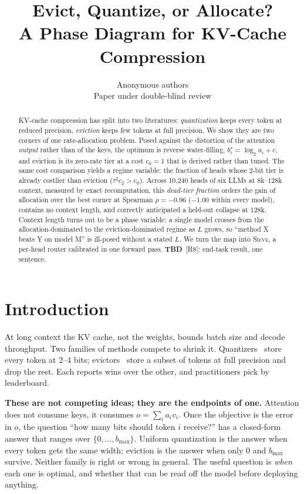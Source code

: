 \documentclass{article} %
\title{Evict, Quantize, or Allocate?\\A Phase Diagram for KV-Cache Compression}
\author{Anonymous authors \\ Paper under double-blind review}
\newcommand{\tbd}[1]{{\color{tbdcol}\textbf{TBD}~#1}}
\newcommand{\sieve}{\textsc{Sieve}}
\theoremstyle{definition}
\begin{document}
\maketitle

\begin{abstract}
KV-cache compression has split into two literatures: \emph{quantization} keeps every token at reduced precision, \emph{eviction} keeps few tokens at full precision. We show they are two corners of one rate-allocation problem. Posed against the distortion of the attention \emph{output} rather than of the keys, the optimum is reverse water-filling, $b_i^\star=\log_2 a_i+c$, and eviction is its zero-rate tier at a cost $c_0{=}1$ that is derived rather than tuned. The same cost comparison yields a regime variable: the fraction of heads whose 2-bit tier is already costlier than eviction ($\tau^2c_2>c_0$). Across 10{,}240 heads of six LLMs at 8k--128k context, measured by exact recomputation, this \emph{dead-tier fraction} orders the gain of allocation over the best corner at Spearman $\rho=-0.96$ ($-1.00$ within every model), contains no context length, and correctly anticipated a held-out collapse at 128k. Context length turns out to be a phase variable: a single model crosses from the allocation-dominated to the eviction-dominated regime as $L$ grows, so ``method X beats Y on model M'' is ill-posed without a stated $L$. We turn the map into \sieve{}, a per-head router calibrated in one forward pass. \tbd{[R8]: end-task result, one sentence.}
\end{abstract}

\section{Introduction}

At long context the KV cache, not the weights, bounds batch size and decode throughput. Two families of methods compete to shrink it. Quantizers~\citep{liu2024kivi,hooper2024kvquant,zandieh2024qjl,zandieh2025turboquant} store every token at 2--4 bits; evictors~\citep{zhang2023h2o,liu2023scissorhands,li2024snapkv,xiao2024streamingllm} store a subset of tokens at full precision and drop the rest. Each reports wins over the other, and practitioners pick by leaderboard.

\textbf{These are not competing ideas; they are the endpoints of one.} Attention does not consume keys, it consumes $o=\sum_i a_iv_i$. Once the objective is the error in $o$, the question ``how many bits should token $i$ receive?'' has a closed-form answer that ranges over $\{0,\dots,b_{\max}\}$. Uniform quantization is the answer when every token gets the same width; eviction is the answer when only $0$ and $b_{\max}$ survive. Neither family is right or wrong in general. The useful question is \emph{when} each one is optimal, and whether that can be read off the model before deploying anything.
\end{document}
